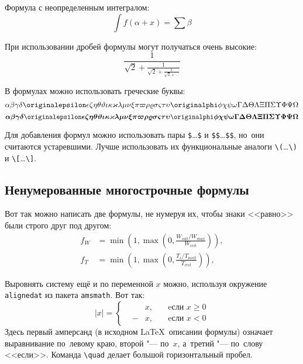 Формула с неопределенным интегралом:
\[
    \int f(\alpha+x)=\sum\beta
\]

При использовании дробей формулы могут получаться очень высокие:
\[
    \frac{1}{\sqrt{2}+
        \displaystyle\frac{1}{\sqrt{2}+
            \displaystyle\frac{1}{\sqrt{2}+\cdots}}}
\]

В формулах можно использовать греческие буквы:
\[
    \alpha\beta\gamma\delta\originalepsilon\epsilon\zeta\eta\theta%
    \vartheta\iota\kappa\varkappa\lambda\mu\nu\xi\pi\varpi\rho\varrho%
    \sigma\varsigma\tau\upsilon\originalphi\phi\chi\psi\omega\Gamma\Delta%
    \Theta\Lambda\Xi\Pi\Sigma\Upsilon\Phi\Psi\Omega
\]
\[%
    \boldsymbol{\alpha\beta\gamma\delta\originalepsilon\epsilon\zeta\eta%
        \theta\vartheta\iota\kappa\varkappa\lambda\mu\nu\xi\pi\varpi\rho%
        \varrho\sigma\varsigma\tau\upsilon\originalphi\phi\chi\psi\omega\Gamma%
        \Delta\Theta\Lambda\Xi\Pi\Sigma\Upsilon\Phi\Psi\Omega}
\]

Для добавления формул можно использовать пары \verb+$+\dots\verb+$+ и \verb+$$+\dots\verb+$$+,
но~они считаются устаревшими.
Лучше использовать их функциональные аналоги \verb+\(+\dots\verb+\)+ и \verb+\[+\dots\verb+\]+.

\subsection{Ненумерованные многострочные формулы}\label{subsec:ch1/sec3/sub2}

Вот так можно написать две формулы, не нумеруя их, чтобы знаки <<равно>> были
строго друг под другом:
\begin{align}
    f_W & =  \min \left( 1, \max \left( 0, \frac{W_{soil} / W_{max}}{W_{crit}} \right)  \right), \nonumber \\
    f_T & =  \min \left( 1, \max \left( 0, \frac{T_s / T_{melt}}{T_{crit}} \right)  \right), \nonumber
\end{align}

Выровнять систему ещё и по переменной \( x \) можно, используя окружение
\verb|alignedat| из пакета \verb|amsmath|. Вот так:
\[
|x| = \left\{
\begin{alignedat}{2}
    &&x, \quad &\text{eсли } x\geqslant 0 \\
    &-&x, \quad & \text{eсли } x<0
\end{alignedat}
\right.
\]
Здесь первый амперсанд (в исходном \LaTeX\ описании формулы) означает
выравнивание по~левому краю, второй "--- по~\( x \), а~третий "--- по~слову
<<если>>. Команда \verb|\quad| делает большой горизонтальный пробел.

